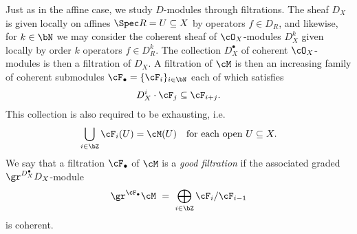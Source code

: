 Just as in the affine case, we study $D$-modules through filtrations. The sheaf $D_X$ is given locally on affines $\Spec R = U \subseteq X$ by operators $f\in D_{R}$, and likewise, for $k \in \bN$ we may consider the coherent sheaf of $\cO_X$-modules $D^k_X$ given locally by order $k$ operators $f \in D^k_{R}$. The collection $D^\bullet_X$ of coherent $\cO_X$-modules is then a filtration of $D_X$. A filtration of $\cM$ is then an increasing family of coherent submodules $\cF_\bullet = \{\cF_i\}_{i\in \bN}$ each of which satisfies
\begin{align*}
	D^i_X\cdot \cF_j \subseteq \cF_{i+j}.
\end{align*}
This collection is also required to be exhausting, i.e.
\begin{align*}
	\bigcup_{i \in \bZ} \cF_i(U) = \cM(U) \hspace{1em} \text{for each open} ~ U \subseteq X.
\end{align*}
We say that a filtration $\cF_\bullet$ of $\cM$ is a \emph{good filtration} if the associated graded $\gr^{D^\bullet_X} D_X$-module
\begin{align*}
	\gr^{\cF_\bullet} \cM ~=~ \bigoplus_{i\in \bZ} \cF_i/\cF_{i-1}
\end{align*}
is coherent.

